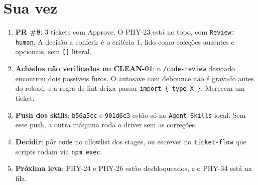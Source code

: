 \documentclass[11pt,a4paper]{article}
\newcommand{\tk}[1]{\texttt{#1}}
\begin{document}
\section{Sua vez}\label{sec:vez}
\begin{enumerate}
  \item \textbf{PR \#8}: 3 tickets com Approve. O PHY-23 está no topo, com \tk{Review: human}. A decisão a conferir é o critério 1, lido como coleções ausentes e opcionais, sem \tk{[]} literal.
  \item \textbf{Achados não verificados no CLEAN-01}: o \tk{/code-review} desviado encontrou dois possíveis furos. O autosave com debounce não é gravado antes do reload, e a regra de lint deixa passar \tk{import \{ type X \}}. Merecem um ticket.
  \item \textbf{Push dos skills}: \tk{b56a5cc} e \tk{901d6c3} estão só no \tk{Agent-Skills} local. Sem esse push, a outra máquina roda o driver sem as correções.
  \item \textbf{Decidir}: pôr \tk{node} no allowlist dos stages, ou escrever no \tk{ticket-flow} que scripts rodam via \tk{npm exec}.
  \item \textbf{Próxima leva}: PHY-24 e PHY-26 estão desbloqueados, e o PHY-34 está na fila.
\end{enumerate}
\end{document}
